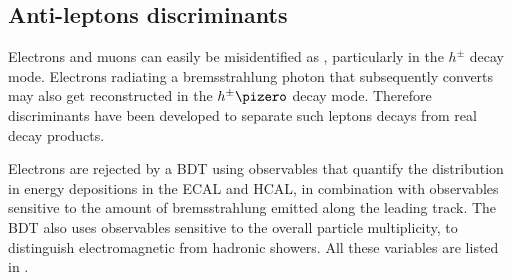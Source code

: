 \subsection{Anti-leptons discriminants}

Electrons and muons can easily be misidentified as \tauh, particularly in the $h^{\pm}$ decay mode. Electrons radiating a bremsstrahlung photon that subsequently converts may also get reconstructed in the $h^{\pm}\pizero$ decay mode. Therefore discriminants have been developed to separate such leptons decays from real \tauh decay products.

Electrons are rejected by a BDT using observables that quantify the distribution in energy depositions in the ECAL and HCAL, in combination with observables sensitive to the amount of bremsstrahlung emitted along the leading track. The BDT also uses observables sensitive to the overall particle multiplicity, to distinguish electromagnetic from hadronic showers.
All these variables are listed in \cite{tauh_reconstruction}.
    
